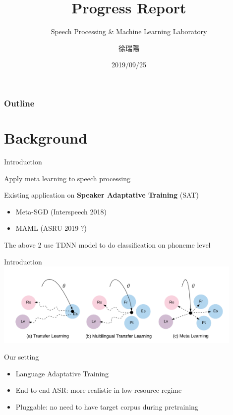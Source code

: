 \documentclass{beamer}
\title{Progress Report}
\subtitle{\textcolor[rgb]{0.00,0.50,1.00}{{Speech Processing \& Machine Learning Laboratory}}}
\author{徐瑞陽}
\date{2019/09/25}
\begin{document}
\begin{frame}
\maketitle
\end{frame}



\begin{frame}
\frametitle{Outline}
\tableofcontents
\end{frame}

\section{Background}
\begin{frame}[t]{Introduction}
  \begin{center}
    Apply meta learning to speech processing 
  \end{center}

  \pause

  Existing application on \textbf{Speaker Adaptative Training} (SAT)
  \begin{itemize}
    \item Meta-SGD (Interspeech 2018)
    \item MAML (ASRU 2019 ?)
  \end{itemize}

  The above 2 use TDNN model to do classification on phoneme level
\end{frame}

\begin{frame}[t]{Introduction}
  \includegraphics[width=0.9\textwidth]{fig/Meta-motivation.png}

  Our setting
  \begin{itemize}
    \item Language Adaptative Training
    \item End-to-end ASR: more realistic in low-resource regime
    \item Pluggable: no need to have target corpus during pretraining
  \end{itemize}
\end{frame}
\end{document}
